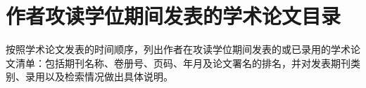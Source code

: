\newpage






\section*{作者攻读学位期间发表的学术论文目录}

    \song{}
    按照学术论文发表的时间顺序，列出作者在攻读学位期间发表的或已录用的学术论文清单：包括期刊名称、卷册号、页码、年月及论文署名的排名，并对发表期刊类别、录用以及检索情况做出具体说明。




\setcounter{secnumdepth}{4}


